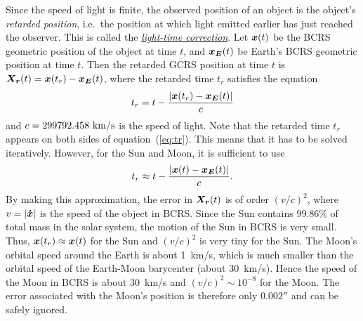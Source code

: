 \documentclass[12pt]{article}
\newcommand \beq {\begin{equation}}
\newcommand \eeq {\end{equation}}
\newcommand{\ve}[1]{\mbox{\boldmath $#1$}}
\begin{document}
\begin{CJK}{UTF8}{bkai}
Since the speed of light is finite, the observed position of an object is the 
object's {\em retarded position}, i.e.\ the position at which light emitted earlier 
has just reached the observer. This is called the 
\href{https://en.wikipedia.org/wiki/Light-time_correction}{\em light-time correction}. 
Let $\ve{x}(t)$ be the BCRS geometric position of the object at time $t$, and 
$\ve{x_E}(t)$ be Earth's BCRS geometric position at time $t$. Then 
the retarded GCRS position at time $t$ is $\ve{X_r}(t) = \ve{x}(t_r) - \ve{x_E}(t)$, 
where the retarded time $t_r$ satisfies the equation 
\beq
  t_r = t - \frac{|\ve{x}(t_r) - \ve{x_E}(t)|}{c} 
\label{eq:tr}
\eeq
and $c=299792.458~{\rm km/s}$ is the speed of light. Note that the retarded time 
$t_r$ appears on both sides of equation~(\ref{eq:tr}). This means that it has to be 
solved iteratively. However, for the Sun and Moon, it is sufficient to use 
\beq
  t_r \approx t - \frac{|\ve{x}(t) - \ve{x_E}(t)|}{c} .
\eeq
By making this approximation, the error in $\ve{X_r}(t)$ is of 
order $(v/c)^2$, where $v=|\ve{\dot{x}}|$ is the speed of the object in BCRS. 
Since the Sun contains 99.86\% of total mass in the solar system, the motion of 
the Sun in BCRS is very small. Thus, $\ve{x}(t_r) \approx \ve{x}(t)$ for the Sun 
and $(v/c)^2$ is very tiny for the Sun. The Moon's orbital 
speed around the Earth is about 1~km/s, which is much smaller than the orbital 
speed of the Earth-Moon barycenter (about 30~km/s). Hence the speed of 
the Moon in BCRS is about 30~km/s and $(v/c)^2\sim 10^{-8}$
for the Moon. The error associated with the Moon's position is therefore 
only $0.002''$ and can be safely ignored.


\end{CJK}
\end{document}
